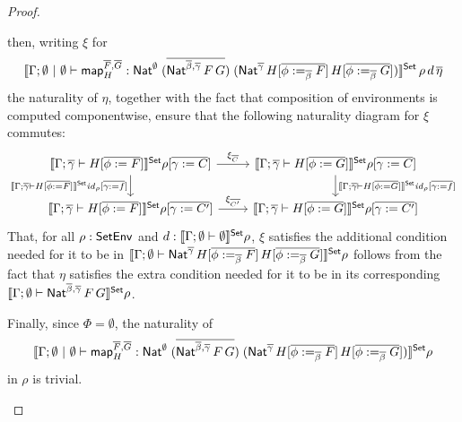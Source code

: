 \documentclass[acmsmall,review,anonymous]{acmart}
\theoremstyle{definition}
\renewcommand{\id}{\mathit{id}}
\newcommand{\map}{\mathsf{map}}
\begin{document}
\begin{proof}
\begin{itemize}
then, writing $\xi$ for
\[
\setsem{\Gamma; \emptyset~|~\emptyset \vdash \map^{\ol{F},\ol{G}}_H
    : \Nat^\emptyset\;(\ol{\Nat^{\ol{\beta},\ol{\gamma}}\,F\,G})\;
    (\Nat^{\ol{\gamma}}\,H[\ol{\phi :=_{\ol{\beta}} F}]\,H[\ol{\phi
        :=_{\ol{\beta}} G}])}\,\rho\,d\, \ol{\eta}
\]
the naturality of $\eta$,
together with the fact that composition of environments is
computed componentwise, ensure that the following naturality diagram
for $\xi$ commutes:
{\footnotesize
\[\begin{tikzcd}
\setsem{\Gamma ;\ol{\gamma} \vdash H[\ol{\phi := F}]}\rho[\ol{\gamma
      := C}] \ar[r, "{\xi_{\ol{C}}}"]
\ar[d, "{\setsem{\Gamma ;\ol{\gamma} \vdash H[\ol{\phi :=
          F}]}\id_{\rho}[\ol{\gamma := f}]}"']
& \setsem{\Gamma ; \ol{\gamma} \vdash H[\ol{\phi := G}]}\rho[\ol{\gamma
      := C}]
\ar[d, "{\setsem{\Gamma ; \ol{\gamma} \vdash H[\ol{\phi :=
          G}]}\id_{\rho}[\ol{\gamma := f}]}"]\\
\setsem{\Gamma ;\ol{\gamma} \vdash H[\ol{\phi := F}]}\rho[\ol{\gamma
      := C'}] \ar[r, "{\xi_{\ol{C'}}}"]
& \setsem{\Gamma ; \ol{\gamma} \vdash H[\ol{\phi := G}]}\rho[\ol{\gamma
      := C'}] 
\end{tikzcd}\]}
That, for all $\rho : \mathsf{SetEnv}$ and $d : \llbracket{\Gamma; \emptyset \vdash
  \emptyset}\rrbracket^{\mathsf{Set}}\rho$, $\xi$ satisfies the additional condition needed for
it to be in $\llbracket{\Gamma; \emptyset \vdash
  \mathsf{Nat}^{\overline{\gamma}}\,H[\overline{\phi :=_{\overline{\beta}} F}]\,H[\overline{\phi
      :=_{\overline{\beta}} G}]}\rrbracket^{\mathsf{Set}}\rho$ follows from the fact
that $\eta$ satisfies the extra
condition needed for it to be in its corresponding
$\llbracket{\Gamma; \emptyset \vdash \mathsf{Nat}^{\overline{\beta},\overline{\gamma}}\,F\,G}\rrbracket^{\mathsf{Set}} \rho$.

Finally, since $\Phi = \emptyset$, the naturality of
\[
\setsem{\Gamma; \emptyset~|~\emptyset \vdash \map^{\ol{F},\ol{G}}_H
    : \Nat^\emptyset\;(\ol{\Nat^{\ol{\beta},\ol{\gamma}}\,F\,G})\;
    (\Nat^{\ol{\gamma}}\,H[\ol{\phi :=_{\ol{\beta}} F}]\,H[\ol{\phi
        :=_{\ol{\beta}} G}])}\rho
\]
in $\rho$ is trivial.


\end{itemize}
\end{proof}
\end{document}
